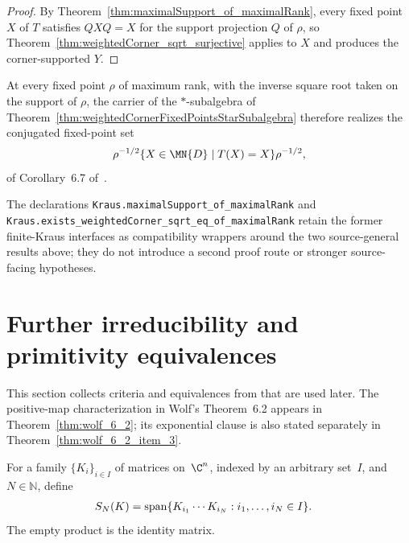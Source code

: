 \begin{proof}
    \leanok
    By Theorem~\ref{thm:maximalSupport_of_maximalRank}, every fixed point
    $X$ of $T$ satisfies $QXQ=X$ for the support projection $Q$ of $\rho$,
    so Theorem~\ref{thm:weightedCorner_sqrt_surjective} applies to $X$ and
    produces the corner-supported $Y$.
\end{proof}

At every fixed point $\rho$ of maximum rank, with the inverse square root
taken on the support of $\rho$, the carrier of the $*$-subalgebra of
Theorem~\ref{thm:weightedCornerFixedPointsStarSubalgebra} therefore realizes
the conjugated fixed-point set
\begin{align}
    \rho^{-1/2}
    \{X\in\MN{D}\mid T(X)=X\}
    \rho^{-1/2},
    \notag
\end{align}
of Corollary~6.7 of~\cite{Wolf2012Quantum}.

The declarations \texttt{Kraus.maximalSupport\_of\_maximalRank} and
\texttt{Kraus.exists\_weightedCorner\_sqrt\_eq\_of\_maximalRank} retain the
former finite-Kraus interfaces as compatibility wrappers around the two
source-general results above; they do not introduce a second proof route or
stronger source-facing hypotheses.

\section{Further irreducibility and primitivity equivalences}

This section collects criteria and equivalences from
\cite[Theorems~6.7 and~6.8]{Wolf2012Quantum} that are used later. The
positive-map characterization in Wolf's Theorem~6.2 appears in
Theorem~\ref{thm:wolf_6_2}; its exponential clause is also stated separately
in Theorem~\ref{thm:wolf_6_2_item_3}.

\begin{definition}
    \label{def:kraus_exact_word_span}
    \leanok
    For a family $\{K_i\}_{i\in I}$ of matrices on~$\C^n$, indexed by an
    arbitrary set~$I$, and $N\in\mathbb N$, define
    \begin{align}
        S_N(K)&=\operatorname{span}\{K_{i_1}\cdots K_{i_N}:i_1,\ldots,i_N\in I\}.
        \notag
    \end{align}
    The empty product is the identity matrix.
\end{definition}

